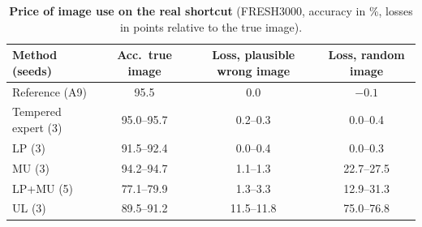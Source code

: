 \begin{table}[tbp]
  \centering
  \footnotesize
  \setlength{\tabcolsep}{2.4pt}
  \begin{tabular}{@{}lccc@{}}
    \toprule
    Method (seeds) & Acc.\ true image & Loss, plausible wrong image & Loss, random image \\
    \midrule
    Reference (A9) & 95.5 & 0.0 & $-0.1$ \\
    Tempered expert (3) & 95.0--95.7 & 0.2--0.3 & 0.0--0.4 \\
    LP (3) & 91.5--92.4 & 0.0--0.4 & 0.0--0.3 \\
    MU (3) & 94.2--94.7 & 1.1--1.3 & 22.7--27.5 \\
    LP+MU (5) & 77.1--79.9 & 1.3--3.3 & 12.9--31.3 \\
    UL (3) & 89.5--91.2 & 11.5--11.8 & 75.0--76.8 \\
    \bottomrule
  \end{tabular}
  \caption{\textbf{Price of image use on the real shortcut} (FRESH3000, accuracy in \%, losses in points relative to the true image).}
  \label{tab:price}
\end{table}
